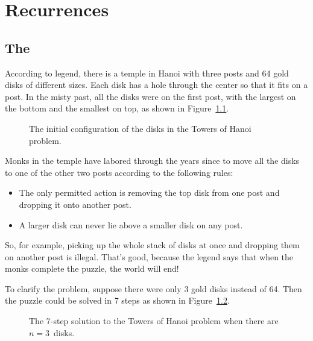 \chapter{Recurrences}\label{chap:recurrences}

\section{The }

\iffalse
According to legend, there is a temple in Hanoi with three posts and
64 gold disks of different sizes.  Each disk has a hole through the
center so that it fits on a post.  In the misty past, all the disks
were on the first post, with the largest on the bottom and the
smallest on top, as shown in Figure~\ref{fig:10A1}.

\begin{figure}


\caption{The initial configuration of the disks in the Towers of Hanoi
  problem.}

\label{fig:10A1}

\end{figure}

Monks in the temple have labored through the years since to move all
the disks to one of the other two posts according to the following
rules:
\begin{itemize}
\item The only permitted action is removing the top disk from one post
and dropping it onto another post.
\item A larger disk can never lie above a smaller disk on any post.
\end{itemize}
So, for example, picking up the whole stack of disks at once
and dropping them on another post is illegal.  That's good, because
the legend says that when the monks complete the puzzle, the world
will end!

To clarify the problem, suppose there were only 3 gold disks instead
of 64.  Then the puzzle could be solved in 7 steps as shown in
Figure~\ref{fig:10A2}.

\begin{figure}


\caption{The 7-step solution to the Towers of Hanoi problem when there
are $n = 3$~disks.}

\label{fig:10A2}

\end{figure}

